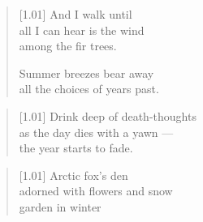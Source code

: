   \begin{verse}[1.01\textwidth]
    And I walk until\\
    all I can hear is the wind\\
    among the fir trees.

    \vin Summer breezes bear away\\
    \vin all the choices of years past.
  \end{verse}

  \begin{verse}[1.01\textwidth]
      Drink deep of death-thoughts\\
      as the day dies with a yawn ---\\
      the year starts to fade.
  \end{verse}

  \vfill

  \newpage

  \null
  \vfill

  \begin{verse}[1.01\textwidth]
      Arctic fox's den\\
      adorned with flowers and snow\\
      garden in winter
  \end{verse}

  \vfill
